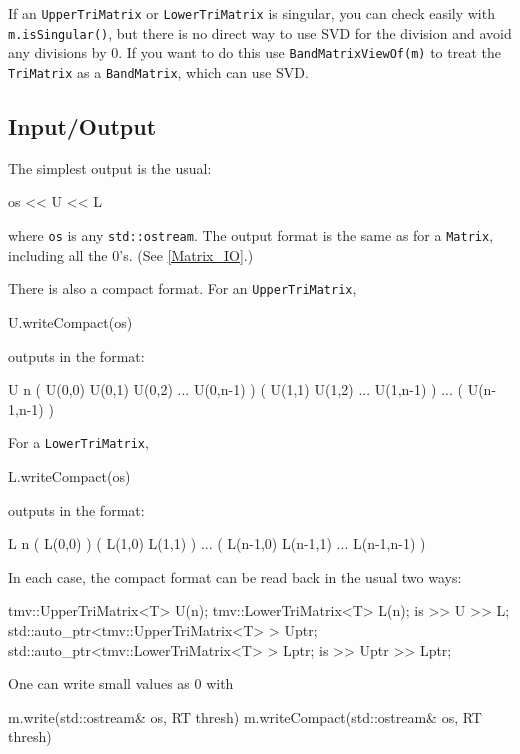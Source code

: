 \documentclass[twoside,letterpaper,11pt]{article}
\renewcommand{\tt}[1]{{\lstinline {#1}}}
\begin{document}
If an \tt{UpperTriMatrix} or \tt{LowerTriMatrix} is singular, 
you can check easily with \tt{m.isSingular()},
but there is no direct way to use SVD for the division and avoid any
divisions by 0.  If you want to do this use \tt{BandMatrixViewOf(m)} to 
treat the \tt{TriMatrix} as a \tt{BandMatrix}, which can use SVD.

\subsection{Input/Output}
\label{TriMatrix_IO}

The simplest output is the usual:
\begin{tmvcode}
os << U << L
\end{tmvcode}
where \tt{os} is any \tt{std::ostream}.
The output format is the same as for a \tt{Matrix}, including all the 0's.
(See \ref{Matrix_IO}.)

There is also a compact format.  For an \tt{UpperTriMatrix},
\begin{tmvcode}
U.writeCompact(os)
\end{tmvcode}
outputs in the format:
\begin{tmvcode}
U n 
( U(0,0)  U(0,1)  U(0,2)  ...  U(0,n-1) )
( U(1,1)  U(1,2)  ...  U(1,n-1) )
...
( U(n-1,n-1) )
\end{tmvcode}
For a \tt{LowerTriMatrix},
\begin{tmvcode}
L.writeCompact(os)
\end{tmvcode}
outputs in the format:
\begin{tmvcode}
L n 
( L(0,0) )
( L(1,0)  L(1,1) )
...
( L(n-1,0)  L(n-1,1) ... L(n-1,n-1) )
\end{tmvcode}

In each case, the compact format can be read back in the usual two ways:
\begin{tmvcode}
tmv::UpperTriMatrix<T> U(n);
tmv::LowerTriMatrix<T> L(n);
is >> U >> L;
std::auto_ptr<tmv::UpperTriMatrix<T> > Uptr;
std::auto_ptr<tmv::LowerTriMatrix<T> > Lptr;
is >> Uptr >> Lptr;
\end{tmvcode}

One can write small values as 0 with
\begin{tmvcode}
m.write(std::ostream& os, RT thresh)
m.writeCompact(std::ostream& os, RT thresh)
\end{tmvcode}
\end{document}
